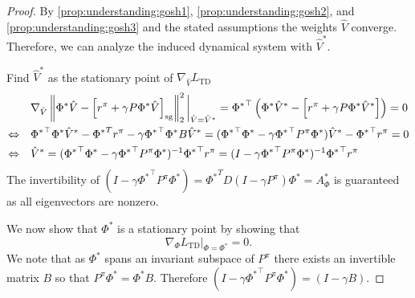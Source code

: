 \begin{proof}
    By \autoref{prop:understanding:gosh1}, \autoref{prop:understanding:gosh2}, and \autoref{prop:understanding:gosh3} and the stated assumptions the weights $\hat{V}$ converge. Therefore, we can analyze the induced dynamical system with $\hat{V}^*$.

    Find $\hat{V}^*$ as the stationary point of $\nabla_{\hat{V}} L_\text{TD}$
    \begin{align}
        & \nabla_{\hat{V}} \left\lVert \Phi^* \hat{V} - \left[r^\pi + \gamma P\Phi^* \hat{V}\right]_\text{sg} \right\rVert_2^2\bigg|_{\hat{V} = \hat{V}^*} = {\Phi^*}^\top\left(\Phi^* \hat{V}^* - \left[r^\pi + \gamma P\Phi^* \hat{V}^*\right]\right) = 0 \\
        \Leftrightarrow \quad & {\Phi^*}^\top \Phi^* \hat{V}^* - {\Phi^*}^T r^\pi - \gamma {\Phi^*}^\top  \Phi^* B \hat{V}^* = ({\Phi^*}^\top \Phi^* - \gamma {\Phi^*}^\top P^\pi \Phi^*) \hat{V}^* - {\Phi^*}^\top r^\pi = 0\\
        \Leftrightarrow \quad & \hat{V}^* = ({\Phi^*}^\top \Phi^* - \gamma {\Phi^*}^\top P^\pi \Phi^*)^{-1} {\Phi^*}^\top r^\pi = (I - \gamma {\Phi^*}^\top P^\pi \Phi^*)^{-1} {\Phi^*}^\top r^\pi
    \end{align}
    The invertibility of $(I - \gamma {\Phi^*}^\top P^\pi \Phi^*) = {\Phi^*}^T D (I - \gamma P^\pi) \Phi^* = A_\Phi^*$ is guaranteed as all eigenvectors are nonzero.

    We now show that $\Phi^*$ is a stationary point by showing that $$\nabla_\Phi L_\text{TD}|_{\Phi = \Phi^*} = 0.$$ We note that as $\Phi^*$ spans an invariant subspace of $P^\pi$ there exists an invertible matrix $B$ so that $P^\pi \Phi^* = \Phi^* B$. Therefore $(I - \gamma {\Phi^*}^\top P^\pi \Phi^*) = (I - \gamma B)$.


\end{proof}
